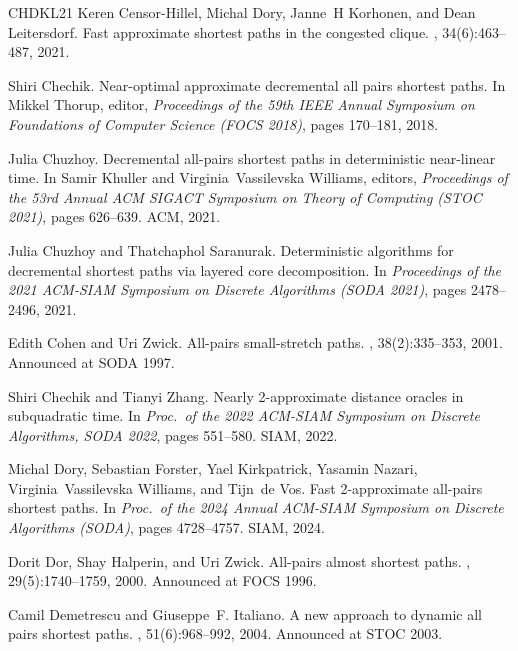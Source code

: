 \documentclass[11pt]{article}
\theoremstyle{definition}
\theoremstyle{remark}
\begin{document}
\begin{titlepage}
\begin{thebibliography}{CHDKL21}
Keren Censor-Hillel, Michal Dory, Janne~H Korhonen, and Dean Leitersdorf.
\newblock Fast approximate shortest paths in the congested clique.
, 34(6):463--487, 2021.

Shiri Chechik.
\newblock Near-optimal approximate decremental all pairs shortest paths.
\newblock In Mikkel Thorup, editor, {\em Proceedings of the 59th {IEEE} Annual
  Symposium on Foundations of Computer Science ({FOCS} 2018)}, pages 170--181,
  2018.

Julia Chuzhoy.
\newblock Decremental all-pairs shortest paths in deterministic near-linear
  time.
\newblock In Samir Khuller and Virginia~Vassilevska Williams, editors, {\em
  Proceedings of the 53rd Annual {ACM} {SIGACT} Symposium on Theory of
  Computing ({STOC} 2021)}, pages 626--639. {ACM}, 2021.

Julia Chuzhoy and Thatchaphol Saranurak.
\newblock Deterministic algorithms for decremental shortest paths via layered
  core decomposition.
\newblock In {\em Proceedings of the 2021 {ACM-SIAM} Symposium on Discrete
  Algorithms ({SODA} 2021)}, pages 2478--2496, 2021.

Edith Cohen and Uri Zwick.
\newblock All-pairs small-stretch paths.
, 38(2):335--353, 2001.
\newblock Announced at {SODA} 1997.

Shiri Chechik and Tianyi Zhang.
\newblock Nearly 2-approximate distance oracles in subquadratic time.
\newblock In {\em Proc.\ of the 2022 {ACM-SIAM} Symposium on Discrete
  Algorithms, {SODA} 2022}, pages 551--580. {SIAM}, 2022.

Michal Dory, Sebastian Forster, Yael Kirkpatrick, Yasamin Nazari,
  Virginia~Vassilevska Williams, and Tijn~de Vos.
\newblock Fast 2-approximate all-pairs shortest paths.
\newblock In {\em Proc.\ of the 2024 Annual ACM-SIAM Symposium on Discrete
  Algorithms (SODA)}, pages 4728--4757. SIAM, 2024.

Dorit Dor, Shay Halperin, and Uri Zwick.
\newblock All-pairs almost shortest paths.
, 29(5):1740--1759, 2000.
\newblock Announced at {FOCS} 1996.

Camil Demetrescu and Giuseppe~F. Italiano.
\newblock A new approach to dynamic all pairs shortest paths.
, 51(6):968--992, 2004.
\newblock Announced at {STOC} 2003.


\end{thebibliography}
\end{titlepage}
\end{document}
